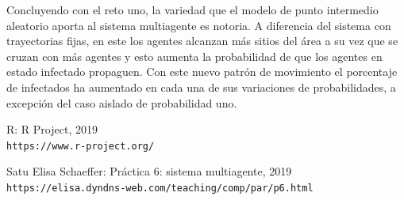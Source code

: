 \documentclass{article}
\begin{document}
Concluyendo con el reto uno, la variedad que el modelo de punto intermedio aleatorio aporta al sistema multiagente es notoria. A diferencia del sistema con trayectorias fijas, en este los agentes alcanzan más sitios del área a su vez que se cruzan con más agentes y esto aumenta la probabilidad de que los agentes en estado infectado propaguen. Con este nuevo patrón de movimiento el porcentaje de infectados ha aumentado en cada una de sus variaciones de probabilidades, a excepción del caso aislado de probabilidad uno.

\begin{thebibliography}{9}

R:  R Project, 2019
\\\texttt{https://www.r-project.org/}

Satu Elisa Schaeffer: Práctica 6: sistema multiagente, 2019
\\\texttt{https://elisa.dyndns-web.com/teaching/comp/par/p6.html}



\end{thebibliography}
\end{document}
